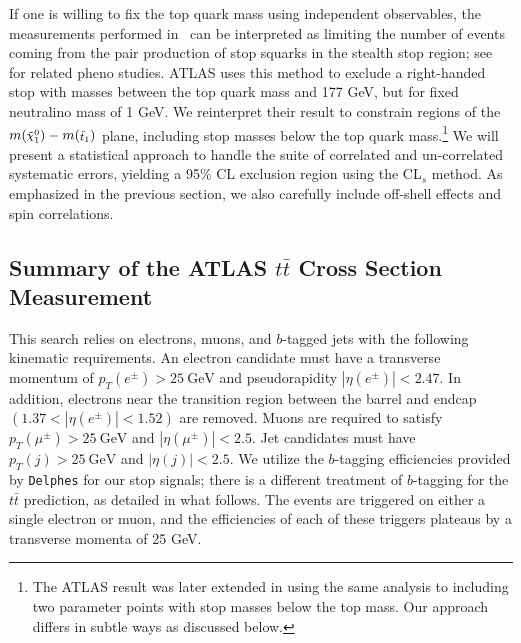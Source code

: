 \documentclass[a4paper,12pt]{article}
\newcommand{\gev}{~\text{GeV}}
\def\mnino{\ensuremath{m({\footnotesize \ninoone})}}
\def\mstop{\ensuremath{m({\footnotesize \stopone})}}
\def\stopone{\ensuremath{\mathchoice%
      {\displaystyle\raise.0ex\hbox{$\displaystyle\tilde t_1$}}%
         {\textstyle\raise-.2ex\hbox{$\textstyle\tilde t_1$}}%
       {\scriptstyle\raise.0ex\hbox{$\scriptstyle\tilde t_1$}}%
 {\scriptscriptstyle\raise.0ex\hbox{$\scriptscriptstyle\tilde t_1$}}}}
\def\ninoone{\ensuremath{\mathchoice%
      {\displaystyle\raise.4ex\hbox{$\displaystyle\tilde\chi^0_1$}}%
         {\textstyle\raise.1ex\hbox{$\textstyle\tilde\chi^0_1$}}%
       {\scriptstyle\raise.3ex\hbox{$\scriptstyle\tilde\chi^0_1$}}%
 {\scriptscriptstyle\raise.3ex\hbox{$\scriptscriptstyle\tilde\chi^0_1$}}}}
\begin{document}
If one is willing to fix the top quark mass using independent observables, the measurements performed in~\cite{TOPQ-2013-04} can be interpreted as limiting the number of events coming from the pair production of stop squarks in the stealth stop region; see~\cite{Czakon:2014fka, Eifert:2014kea} for related pheno studies.  ATLAS uses this method to exclude a right-handed stop with masses between the top quark mass and 177 GeV, but for fixed neutralino mass of 1 GeV. We reinterpret their result to constrain regions of the $\mnino - \mstop$ plane, including stop masses below the top quark mass.\footnote{The ATLAS result was later extended in \cite{SUSY-2014-07} using the same analysis to including two parameter points with stop masses below the top mass.  Our approach differs in subtle ways as discussed below.}  We will present a statistical approach to handle the suite of correlated and un-correlated systematic errors, yielding a 95\% CL exclusion region using the CL$_s$ method.  As emphasized in the previous section, we also carefully include off-shell effects and spin correlations. 

\subsection{\boldmath Summary of the ATLAS $t\bar{t}$ Cross Section Measurement}
\label{sec:CrossSection}

This search relies on electrons, muons, and $b$-tagged jets with the following kinematic requirements.  An electron candidate must have a transverse momentum of $p_T(e^{\pm})> 25 \gev$ and pseudorapidity $ |\eta(e^{\pm})| < 2.47$. In addition, electrons near the transition region between the barrel and endcap $( 1.37 < |\eta(e^{\pm}) | < 1.52)$ are removed.  Muons are required to satisfy $p_T(\mu^{\pm}) > 25\gev$ and $|\eta(\mu^{\pm})| < 2.5$. Jet candidates must have $p_T(j) > 25 \gev$ and $|\eta(j)| < 2.5$.  We utilize the $b$-tagging efficiencies provided by \texttt{Delphes} for our stop signals; there is a different treatment of $b$-tagging for the $t\bar{t}$ prediction, as detailed in what follows. The events are triggered on either a single electron or muon, and the efficiencies of each of these triggers plateaus by a transverse momenta of 25 GeV.  
\end{document}
